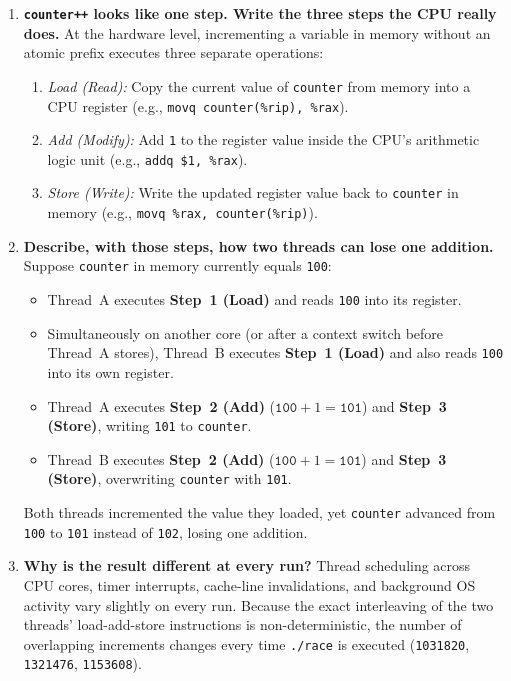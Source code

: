 \documentclass{../latex/utmreport}
\providecommand{\tightlist}{\setlength{\itemsep}{0pt}\setlength{\parskip}{0pt}}
\begin{document}
\begin{enumerate}
\tightlist
\item \textbf{\texttt{counter++} looks like one step. Write the three steps the CPU really does.}
At the hardware level, incrementing a variable in memory without an atomic prefix executes three separate operations:
\begin{enumerate}
\tightlist
\item \emph{Load (Read):} Copy the current value of \texttt{counter} from memory into a CPU register (e.g., \texttt{movq counter(\%rip), \%rax}).
\item \emph{Add (Modify):} Add \texttt{1} to the register value inside the CPU's arithmetic logic unit (e.g., \texttt{addq \$1, \%rax}).
\item \emph{Store (Write):} Write the updated register value back to \texttt{counter} in memory (e.g., \texttt{movq \%rax, counter(\%rip)}).
\end{enumerate}

\item \textbf{Describe, with those steps, how two threads can lose one addition.}
Suppose \texttt{counter} in memory currently equals \texttt{100}:
\begin{itemize}
\tightlist
\item Thread~A executes \textbf{Step~1 (Load)} and reads \texttt{100} into its register.
\item Simultaneously on another core (or after a context switch before Thread~A stores), Thread~B executes \textbf{Step~1 (Load)} and also reads \texttt{100} into its own register.
\item Thread~A executes \textbf{Step~2 (Add)} ($\texttt{100} + 1 = \texttt{101}$) and \textbf{Step~3 (Store)}, writing \texttt{101} to \texttt{counter}.
\item Thread~B executes \textbf{Step~2 (Add)} ($\texttt{100} + 1 = \texttt{101}$) and \textbf{Step~3 (Store)}, overwriting \texttt{counter} with \texttt{101}.
\end{itemize}
Both threads incremented the value they loaded, yet \texttt{counter} advanced from \texttt{100} to \texttt{101} instead of \texttt{102}, losing one addition.

\item \textbf{Why is the result different at every run?}
Thread scheduling across CPU cores, timer interrupts, cache-line invalidations, and background OS activity vary slightly on every run. Because the exact interleaving of the two threads' load-add-store instructions is non-deterministic, the number of overlapping increments changes every time \texttt{./race} is executed (\texttt{1031820}, \texttt{1321476}, \texttt{1153608}).
\end{enumerate}
\end{document}
